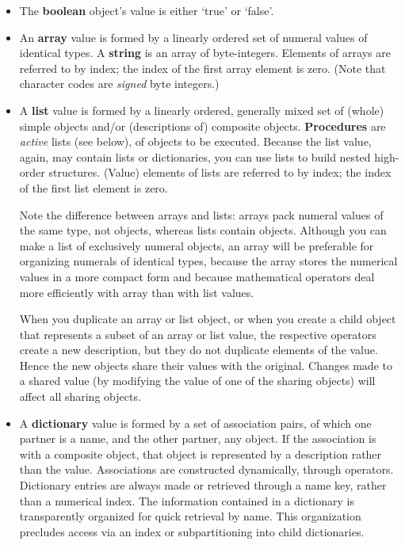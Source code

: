 \begin{itemize}
\item The \textbf{boolean} object's value is either `true' or `false'.

\item An \textbf{array} value is formed by a linearly ordered set of numeral values  of identical  types.  A \textbf{string} is an array of  byte-integers.  Elements  of arrays  are referred to by index;  the index of the  first  array element is zero. (Note that character codes are \emph{signed} byte integers.)

\item A  \textbf{list} value is formed by a linearly ordered,  generally mixed  set  of (whole)  simple  objects  and/or  (descriptions  of)  composite  objects. \textbf{Procedures} are \emph{active} lists (see below),  of objects  to  be  executed. Because the list value,  again,  may contain lists or  dictionaries,  you can use lists to build nested high-order structures.  (Value) elements of lists  are  referred to by index;  the index of  the  first  list element is zero.

Note  the  difference  between arrays and  lists:  arrays  pack  numeral values of the same type, not objects, whereas lists contain objects. Although you can make a  list of exclusively numeral  objects,  an  array  will  be preferable for organizing numerals of identical types,  because the array stores  the  numerical  values  in  a  more  compact  form  and   because mathematical  operators deal more efficiently with array than  with  list values.

When you duplicate an array or list object,  or when you create a  child object that represents a subset of an array or list value, the respective operators create a new description, but they do not duplicate elements of the  value.  Hence the new objects share their values with the  original. Changes made to a shared value (by modifying the value of one of the sharing objects) will affect all sharing objects.

\item A \textbf{dictionary} value is formed by a set of association pairs, of which one partner is a name,  and the other partner, any object. If the association is with a composite object,  that object is represented by a  description rather than the value.  Associations are constructed dynamically, through operators. Dictionary entries are always made or retrieved through a name key,  rather  than  a numerical index.  The information  contained  in  a dictionary is transparently organized for quick retrieval by  name.  This organization precludes access via an index or subpartitioning into  child dictionaries.


\end{itemize}
